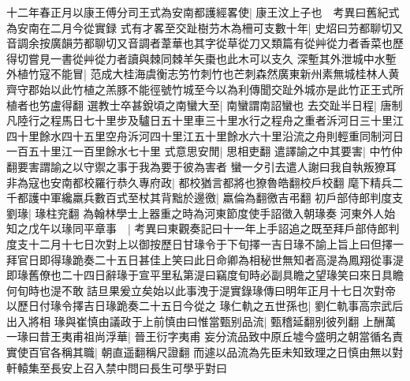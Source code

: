 十二年春正月以康王傅分司王式為安南都護經畧使|{
	康王汶上子也　考異曰舊紀式為安南在二月今從實録}
式有才畧至交趾樹芀木為柵可支數十年|{
	史炤曰芀都聊切又音調余按廣韻芀都聊切又音調者葦華也其字從草從刀又類篇有從艸從力者香菜也歷得切嘗見一書從艸從力者讀與棘同棘羊矢棗也此木可以支久}
深塹其外泄城中水塹外植竹寇不能冒|{
	范成大桂海虞衡志竻竹刺竹也芒刺森然廣東新州素無城桂林人黄齊守郡始以此竹植之羔豚不能徑號竹城至今以為利傳聞交趾外城亦是此竹正王式所植者也竻盧得翻}
選教士卒甚銳頃之南蠻大至|{
	南蠻謂南詔蠻也}
去交趾半日程|{
	唐制凡陸行之程馬日七十里步及驢日五十里車三十里水行之程舟之重者泝河日三十里江四十里餘水四十五里空舟泝河四十里江五十里餘水六十里沿流之舟則輕重同制河日一百五十里江一百里餘水七十里}
式意思安閒|{
	思相吏翻}
遣譯諭之中其要害|{
	中竹仲翻要害謂諭之以守禦之事于我為要于彼為害者}
蠻一夕引去遣人謝曰我自執叛獠耳非為寇也安南都校羅行恭久專府政|{
	都校猶言都將也獠魯皓翻校戶校翻}
麾下精兵二千都護中軍纔羸兵數百式至杖其背黜於邊徼|{
	羸倫為翻徼吉弔翻}
初戶部侍郎判度支劉瑑|{
	瑑柱兖翻}
為翰林學士上器重之時為河東節度使手詔徵入朝瑑奏河東外人始知之戊午以瑑同平章事　|{
	考異曰東觀奏記曰十一年上手詔追之既至拜戶部侍郎判度支十二月十七日次對上以御按歷日甘瑑令于下旬擇一吉日瑑不諭上旨上曰但擇一拜官日即得瑑跪奏二十五日甚佳上笑曰此日命卿為相秘世無知者高湜為鳳翔從事湜即瑑舊僚也二十四日辭瑑于宣平里私第湜曰竊度旬時必副具瞻之望瑑笑曰來日具瞻何旬時也湜不敢詰旦果爰立矣始以此事洩于湜實錄瑑傳曰明年正月十七日次對帝以歷日付瑑令擇吉日瑑跪奏二十五日今從之}
瑑仁軌之五世孫也|{
	劉仁軌事高宗武后出入將相}
瑑與崔慎由議政于上前慎由曰惟當甄别品流|{
	甄稽延翻别彼列翻}
上酬萬一瑑曰昔王夷甫祖尚浮華|{
	晉王衍字夷甫}
妄分流品致中原丘墟今盛明之朝當循名責實使百官各稱其職|{
	朝直遥翻稱尺證翻}
而遽以品流為先臣未知致理之日慎由無以對軒轅集至長安上召入禁中問曰長生可學乎對曰

